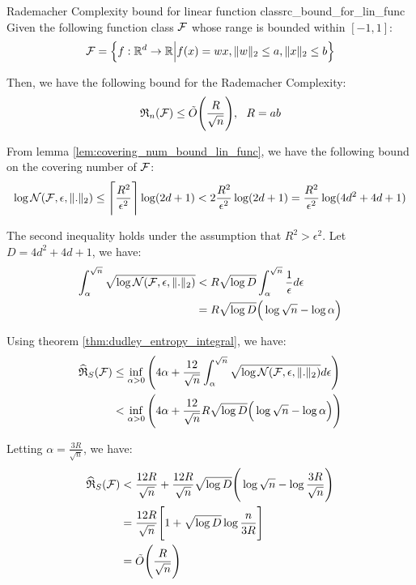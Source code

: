 \begin{proposition}{Rademacher Complexity bound for linear function class}{rc_bound_for_lin_func}
    Given the following function class $\mathcal{F}$ whose range is bounded within $[-1, 1]$:
    \begin{align*}
        \mathcal{F} = \Big\{ 
            f:\mathbb{R}^d\to\mathbb{R} \Big| f(x) = wx, \|w\|_2 \le a, \|x\|_2 \le b
         \Big\}
    \end{align*}

    \noindent Then, we have the following bound for the Rademacher Complexity:
    \begin{align*}
        \mathfrak{R}_n(\mathcal{F}) \le \tilde O \Bigg( \frac{R}{\sqrt{n}} \Bigg), \ \ R = ab
    \end{align*}
\end{proposition}

\begin{proof*}
    \noindent From lemma \ref{lem:covering_num_bound_lin_func}, we have the following bound on the covering number of $\mathcal{F}$:
    \begin{align*}
        \log\mathcal{N}(\mathcal{F}, \epsilon, \|.\|_2) \le \Bigg\lceil \frac{R^2}{\epsilon^2} \Bigg\rceil \log(2d+1) < 2\frac{R^2}{\epsilon^2}\log(2d+1) = \frac{R^2}{\epsilon^2}\log(4d^2 + 4d + 1)
    \end{align*}

    \noindent The second inequality holds under the assumption that $R^2 > \epsilon^2$. Let $D = 4d^2 + 4d + 1$, we have:
    \begin{align*}
        \int_\alpha^{\sqrt n} \sqrt{\log\mathcal{N}(\mathcal{F}, \epsilon, \|.\|_2)} 
            &< R\sqrt{\log D}\int_\alpha^{\sqrt n} \frac{1}{\epsilon}d\epsilon \\
            &= R\sqrt{\log D}\Big(  \log\sqrt{n} - \log\alpha  \Big)
    \end{align*}

    \noindent Using theorem \ref{thm:dudley_entropy_integral}, we have:
    \begin{align*}
        \widehat{\mathfrak{R}}_S(\mathcal{F}) 
            &\le \inf_{\alpha>0}\Bigg( 
                4\alpha + \frac{12}{\sqrt n} \int_\alpha^{\sqrt n} \sqrt{\log\mathcal{N}(\mathcal{F}, \epsilon, \|.\|_2)} d\epsilon
             \Bigg) \\
            &< \inf_{\alpha>0}\Bigg( 
                4\alpha + \frac{12}{\sqrt n} R\sqrt{\log D} \Big(  \log\sqrt{n} - \log\alpha  \Big)
             \Bigg)
    \end{align*}

    \noindent Letting $\alpha=\frac{3R}{\sqrt n}$, we have:
    \begin{align*}
        \widehat{\mathfrak{R}}_S(\mathcal{F}) &< \frac{12R}{\sqrt n} + \frac{12R}{\sqrt n}\sqrt{\log D} \Bigg(  \log \sqrt{n} - \log\frac{3R}{\sqrt n}  \Bigg) \\
        &= \frac{12R}{\sqrt n} \Bigg[ 
            1 + \sqrt{\log D}\log\frac{n}{3R}
         \Bigg] \\
        &= \tilde O\Bigg(  \frac{R}{\sqrt n}  \Bigg)
    \end{align*}


\end{proof*}
